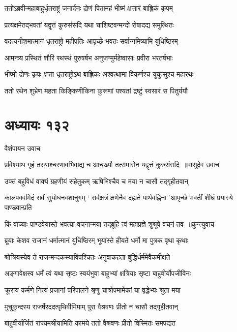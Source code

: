 \twolineshloka
{ततोऽब्रवीन्महाबाहुर्धृतराष्ट्रं जनार्दनः}
{द्रोणं पितामहं भीष्मं क्षत्तारं बाह्लिकं कृपम्}


\twolineshloka
{प्रत्यक्षमेतद्भवतां यद्वृत्तं कुरुसंसदि}
{यथा चाशिष्टवन्मन्दो रोषादद्य समुत्थितः}


\twolineshloka
{वदत्यनीशमात्मानं धृतराष्ट्रो महीपतिः}
{आपृच्छे भवतः सर्वान्गमिष्यामि युधिष्ठिरम्}


\twolineshloka
{आमन्त्र्य प्रस्थितं शौरिं रथस्थं पुरुषर्षभ}
{अनुजग्मुर्महेष्वासाः प्रवीरा भरतर्षभाः}


\twolineshloka
{भीष्मो द्रोणः कृपः क्षत्ता धृतराष्ट्रोऽथ बाह्लिकः}
{अश्वत्थामा विकर्णश्च युयुत्सुश्च महारथः}


\twolineshloka
{ततो रथेन शुभ्रेण महता किङ्किणीकिना}
{कुरूणां पश्यतां द्रष्टुं स्वसारं स पितुर्ययौ}


\chapter{अध्यायः १३२}
\twolineshloka
{वैशंपायन उवाच}
{}


\threelineshloka
{प्रविश्याथ गृहं तस्याश्चरणावभिवाद्य च}
{आचख्यौ तत्समासेन यद्वृत्तं कुरुसंसदि ॥वासुदेव उवाच}
{}


\twolineshloka
{उक्तं बहुविधं वाक्यं ग्रहणीयं सहेतुकम्}
{ऋषिभिश्चैव च मया न चासौ तद्गृहीतवान्}


\threelineshloka
{कालपक्वमिदं सर्वं सुयोधनवशानुगम्}
{` सर्वक्षत्रं क्षणेनैव दह्यते पार्थवह्निना}
{'आपृच्छे भवतीं शीघ्रं प्रयास्ये पाण्डवान्प्रति}


\threelineshloka
{किं वाच्याः पाण्डवेयास्ते भवत्या वचनान्मया}
{तद्ब्रूहि त्वं महाप्रज्ञे शुश्रूषे वचनं तव ॥कुन्त्युवाच}
{}


\twolineshloka
{ब्रूयाः केशव राजानं धर्मात्मानं युधिष्ठिरम्}
{भूयांस्ते हीयते धर्मो मा पुत्रक वृथा कृथाः}


\twolineshloka
{श्रोत्रियस्येव ते राजन्मन्दकस्याविपश्चितः}
{अनुवाकहता बुद्धिर्धर्ममेवैकमीक्षते}


\twolineshloka
{अङ्गावेक्षस्व धर्मं त्वं यथा सृष्टः स्वयंभुवा}
{बाहुभ्यां क्षत्रियाः सृष्टा बाहुवीर्योपजीविनः}


\twolineshloka
{क्रूराय कर्मणे नित्यं प्रजानां परिपालने}
{श्रृणु चात्रोपमामेकां या वृद्धेभ्यः श्रुता मया}


\twolineshloka
{मुचुकुन्दस्य राजर्षेरददत्पृथिवीमिमाम्}
{पुरा वैश्रवणः प्रीतो न चासौ तद्गृहीतवान्}


\twolineshloka
{बाहुवीर्यार्जितं राज्यमश्रीयामिति कामये}
{ततो वैश्रवणः प्रीतो विस्मितः समपद्यत}


